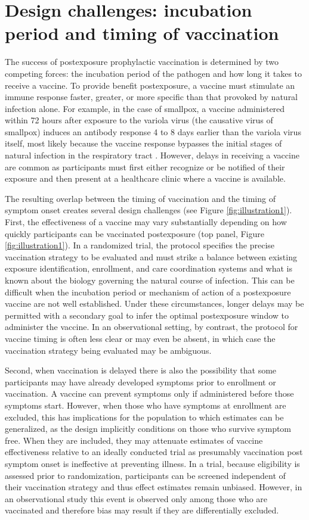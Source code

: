 \documentclass[11pt]{article}
\begin{document}
\section{Design challenges: incubation period and timing of vaccination}
The success of postexposure prophylactic vaccination is determined by two competing forces: the incubation period of the pathogen and how long it takes to receive a vaccine. To provide benefit postexposure, a vaccine must stimulate an immune response faster, greater, or more specific than that provoked by natural infection alone. For example, in the case of smallpox, a vaccine administered within 72 hours after exposure to the variola virus (the causative virus of smallpox) induces an antibody response 4 to 8 days earlier than the variola virus itself, most likely because the vaccine response bypasses the initial stages of natural infection in the respiratory tract \cite{massoudi_effectiveness_2003,keckler_effects_2013}. However, delays in receiving a vaccine are common as participants must first either recognize or be notified of their exposure and then present at a healthcare clinic where a vaccine is available. 

The resulting overlap between the timing of vaccination and the timing of symptom onset creates several design challenges (see Figure \ref{fig:illustration1}). First, the effectiveness of a vaccine may vary substantially depending on how quickly participants can be vaccinated postexposure (top panel, Figure \ref{fig:illustration1}). In a randomized trial, the protocol specifies the precise vaccination strategy to be evaluated and must strike a balance between existing exposure identification, enrollment, and care coordination systems and what is known about the biology governing the natural course of infection. This can be difficult when the incubation period or mechanism of action of a postexposure vaccine are not well established. Under these circumstances, longer delays may be permitted with a secondary goal to infer the optimal postexposure window to administer the vaccine. In an observational setting, by contrast, the protocol for vaccine timing is often less clear or may even be absent, in which case the vaccination strategy being evaluated may be ambiguous.

Second, when vaccination is delayed there is also the possibility that some participants may have already developed symptoms prior to enrollment or vaccination. A vaccine can prevent symptoms only if administered before those symptoms start. However, when those who have symptoms at enrollment are excluded, this has implications for the population to which estimates can be generalized, as the design implicitly conditions on those who survive symptom free. When they are included, they may attenuate estimates of vaccine effectiveness relative to an ideally conducted trial as presumably vaccination post symptom onset is ineffective at preventing illness. In a trial, because eligibility is assessed prior to randomization, participants can be screened independent of their vaccination strategy and thus effect estimates remain unbiased. However, in an observational study this event is observed only among those who are vaccinated and therefore bias may result if they are differentially excluded.
\end{document}
